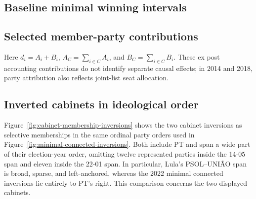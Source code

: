 \documentclass[11pt]{article}
\begin{document}


\subsection{Baseline minimal winning intervals}
\label{app:minimal-connected-winning}



\subsection{Selected member-party contributions}
\label{app:party-contributions}

Here \(d_i=A_i+B_i\), \(A_C=\sum_{i\in C}A_i\), and
\(B_C=\sum_{i\in C}B_i\). These ex post accounting contributions do not
identify separate causal effects; in 2014 and 2018, party attribution also
reflects joint-list seat allocation.



\clearpage
\subsection{Inverted cabinets in ideological order}
\label{app:cabinet-interval-bridge}

Figure~\ref{fig:cabinet-membership-inversions} shows the two cabinet inversions
as selective memberships in the same ordinal party orders used in
Figure~\ref{fig:minimal-connected-inversions}. Both include PT and span a wide
part of their election-year order, omitting twelve represented parties inside
the 14-05 span and eleven inside the 22-01 span. In particular, Lula's
PSOL--UNIÃO span is broad, sparse, and left-anchored, whereas the 2022 minimal
connected inversions lie entirely to PT's right. This comparison concerns the
two displayed cabinets.

\end{document}
